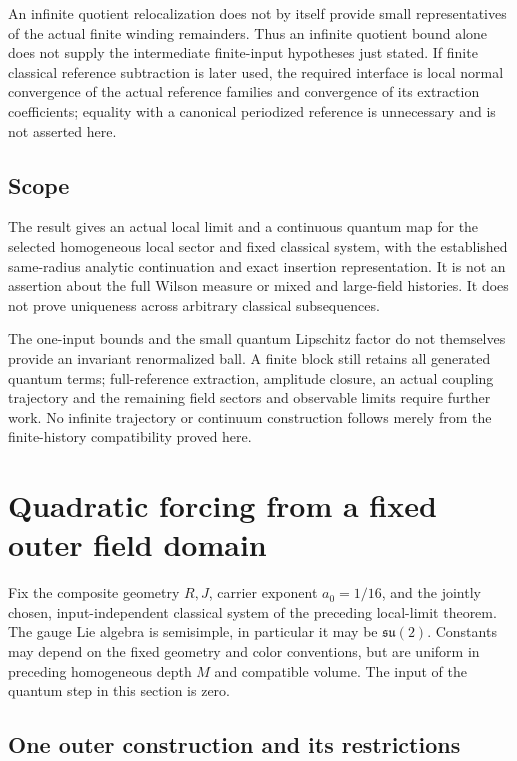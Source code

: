 \documentclass[11pt]{article}
\theoremstyle{remark}
\begin{document}
An infinite quotient relocalization does not by itself provide
small representatives of the actual finite winding remainders.
Thus an infinite quotient bound alone does not supply the
intermediate finite-input hypotheses just stated. If finite
classical reference subtraction is later used, the required
interface is local normal convergence of the actual reference
families and convergence of its extraction coefficients;
equality with a canonical periodized reference is unnecessary
and is not asserted here.

\subsection{Scope}
\label{qll-scope}

The result gives an actual local limit and a continuous
quantum map for the selected homogeneous local sector and
fixed classical system, with the established same-radius
analytic continuation and exact insertion representation.
It is not an assertion about the full Wilson measure or
mixed and large-field histories. It does not prove uniqueness
across arbitrary classical subsequences.

The one-input bounds and the small quantum Lipschitz factor
do not themselves provide an invariant renormalized ball.
A finite block still retains all generated quantum terms;
full-reference extraction, amplitude closure, an actual
coupling trajectory and the remaining field sectors and
observable limits require further work. No infinite
trajectory or continuum construction follows merely from
the finite-history compatibility proved here.


\section{Quadratic forcing from a fixed outer field domain}
\label{zif-section}

Fix the composite geometry $R,J$, carrier exponent $a_0=1/16$,
and the jointly chosen, input-independent classical system of
the preceding local-limit theorem. The gauge Lie algebra is
semisimple, in particular it may be $\mathfrak{su}(2)$.
Constants may depend on the fixed geometry and color conventions,
but are uniform in preceding homogeneous depth $M$ and compatible
volume. The input of the quantum step in this section is zero.

\subsection{One outer construction and its restrictions}
\label{zif-outer-section}
\end{document}

